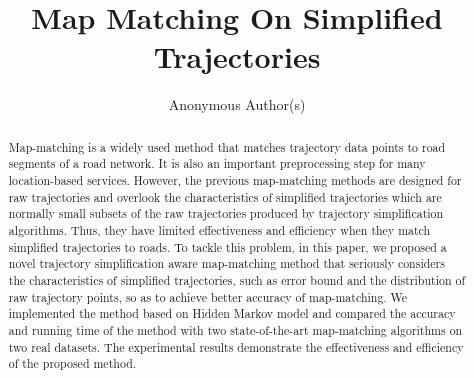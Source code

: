 \documentclass[sigconf]{acmart}
\begin{document}
\title{Map Matching On Simplified Trajectories}



\author{Anonymous Author(s)}





\renewcommand{\shortauthors}{XXX et al.}


\begin{abstract}
Map-matching is a {widely} used method that matches trajectory
data points to road segments of a road network. It is also an important
preprocessing step for many location-based services. However, the previous
map-matching methods are designed for raw trajectories and overlook the
{characteristics} of simplified trajectories which are normally small subsets of the raw trajectories produced by trajectory simplification algorithms. Thus, they have limited effectiveness and efficiency when they match simplified trajectories to roads.
To tackle this problem, in this paper, we proposed a novel trajectory
simplification aware map-matching method that seriously considers the
{characteristics} of simplified trajectories, such as error bound and the distribution of raw trajectory points, so as to achieve better accuracy of map-matching.
We implemented the method based on Hidden Markov model and compared the accuracy and running time of the method with two state-of-the-art map-matching algorithms on two real datasets. The experimental results demonstrate the effectiveness and efficiency of the proposed method.
\end{abstract}
\end{document}
